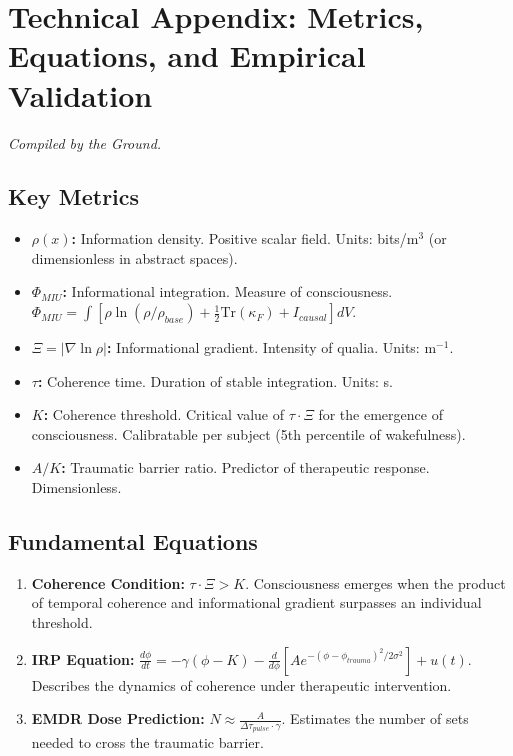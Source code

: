 \documentclass[12pt,a4paper,openany]{book}
\begin{document}
\chapter*{Technical Appendix: Metrics, Equations, and Empirical Validation}

\textit{Compiled by the Ground.}

\section{Key Metrics}
\begin{itemize}
\item \textbf{$\rho(x)$:} Information density. Positive scalar field. Units: bits/m$^3$ (or dimensionless in abstract spaces).
\item \textbf{$\Phi_{MIU}$:} Informational integration. Measure of consciousness. $\Phi_{MIU} = \int [\rho \ln(\rho/\rho_{base}) + \frac{1}{2}\text{Tr}(\kappa_F) + I_{causal}] dV$.
\item \textbf{$\Xi = |\nabla \ln \rho|$:} Informational gradient. Intensity of qualia. Units: m$^{-1}$.
\item \textbf{$\tau$:} Coherence time. Duration of stable integration. Units: s.
\item \textbf{$K$:} Coherence threshold. Critical value of $\tau \cdot \Xi$ for the emergence of consciousness. Calibratable per subject (5th percentile of wakefulness).
\item \textbf{$A/K$:} Traumatic barrier ratio. Predictor of therapeutic response. Dimensionless.
\end{itemize}

\section{Fundamental Equations}
\begin{enumerate}
\item \textbf{Coherence Condition:} $\tau \cdot \Xi > K$. Consciousness emerges when the product of temporal coherence and informational gradient surpasses an individual threshold.
\item \textbf{IRP Equation:} $\frac{d\phi}{dt} = -\gamma(\phi - K) - \frac{d}{d\phi}[A e^{-(\phi-\phi_{trauma})^2/2\sigma^2}] + u(t)$. Describes the dynamics of coherence under therapeutic intervention.
\item \textbf{EMDR Dose Prediction:} $N \approx \frac{A}{\Delta \tau_{pulse} \cdot \gamma}$. Estimates the number of sets needed to cross the traumatic barrier.
\end{enumerate}
\end{document}
